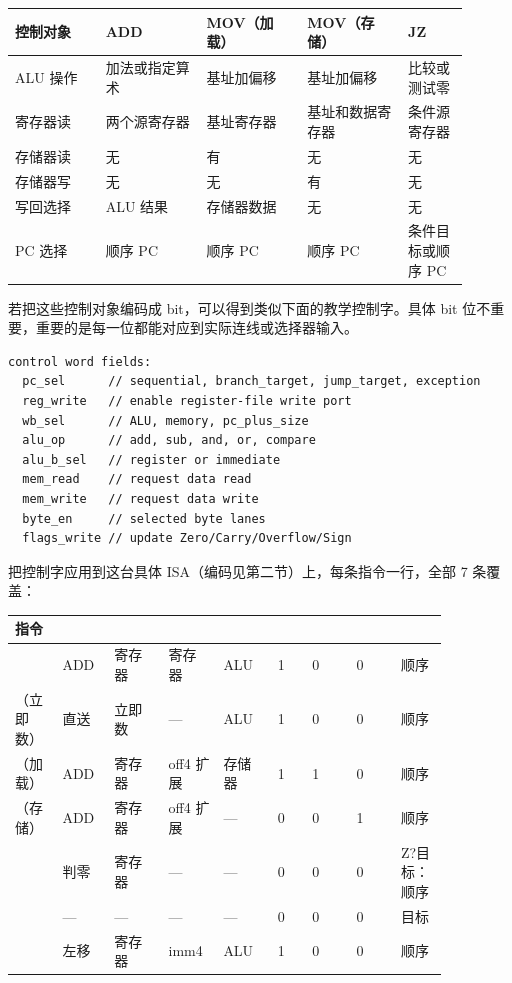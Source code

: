\begin{longtable}{L{0.18\linewidth}L{0.2\linewidth}L{0.2\linewidth}L{0.2\linewidth}L{0.12\linewidth}}
\toprule
控制对象 & ADD & MOV（加载） & MOV（存储） & JZ \\
\midrule
ALU 操作 & 加法或指定算术 & 基址加偏移 & 基址加偏移 & 比较或测试零 \\
寄存器读 & 两个源寄存器 & 基址寄存器 & 基址和数据寄存器 & 条件源寄存器 \\
存储器读 & 无 & 有 & 无 & 无 \\
存储器写 & 无 & 无 & 有 & 无 \\
写回选择 & ALU 结果 & 存储器数据 & 无 & 无 \\
PC 选择 & 顺序 PC & 顺序 PC & 顺序 PC & 条件目标或顺序 PC \\
\bottomrule
\end{longtable}

若把这些控制对象编码成 bit，可以得到类似下面的教学控制字。具体 bit 位不重要，重要的是每一位都能对应到实际连线或选择器输入。

\begin{lstlisting}
control word fields:
  pc_sel      // sequential, branch_target, jump_target, exception
  reg_write   // enable register-file write port
  wb_sel      // ALU, memory, pc_plus_size
  alu_op      // add, sub, and, or, compare
  alu_b_sel   // register or immediate
  mem_read    // request data read
  mem_write   // request data write
  byte_en     // selected byte lanes
  flags_write // update Zero/Carry/Overflow/Sign
\end{lstlisting}

把控制字应用到这台具体 ISA（编码见第二节）上，每条指令一行，全部 7 条覆盖：

{\setlength{\tabcolsep}{2pt}
\begin{longtable}{L{0.09\linewidth}L{0.1\linewidth}L{0.11\linewidth}L{0.11\linewidth}L{0.11\linewidth}L{0.07\linewidth}L{0.09\linewidth}L{0.09\linewidth}L{0.09\linewidth}}
\toprule
指令 &  &  &  &  &  &  &  &  \\
\midrule
{} & ADD & 寄存器 & 寄存器 & ALU & 1 & 0 & 0 & 顺序 \\
（立即数） & 直送 & 立即数 & — & ALU & 1 & 0 & 0 & 顺序 \\
（加载） & ADD & 寄存器 & off4 扩展 & 存储器 & 1 & 1 & 0 & 顺序 \\
（存储） & ADD & 寄存器 & off4 扩展 & — & 0 & 0 & 1 & 顺序 \\
 & 判零 & 寄存器 & — & — & 0 & 0 & 0 & Z?目标：顺序 \\
 & — & — & — & — & 0 & 0 & 0 & 目标 \\
 & 左移 & 寄存器 & imm4 & ALU & 1 & 0 & 0 & 顺序 \\
\bottomrule
\end{longtable}
}

